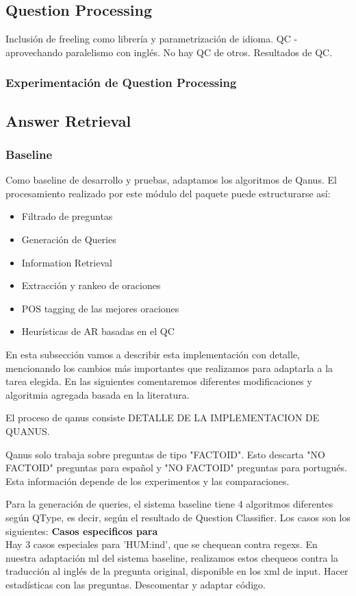 \subsection{Question Processing}
Inclusión de freeling como librería y parametrización de idioma.
QC -aprovechando paralelismo con inglés. No hay QC de otros.
Resultados de QC.
\subsubsection{Experimentación de Question Processing}
\subsection{Answer Retrieval}
\subsubsection{Baseline}
Como baseline de desarrollo y pruebas, adaptamos los algoritmos de Qanus. 
El procesamiento realizado por este módulo del paquete puede estructurarse así:
\begin{itemize}
  \item Filtrado de preguntas
  \item Generación de Queries
  \item Information Retrieval
  \item Extracción y rankeo de oraciones
  \item POS tagging de las mejores oraciones
  \item Heurísticas de AR basadas en el QC
\end{itemize}
En esta subsección vamos a describir esta implementación con detalle, mencionando los cambios más importantes que realizamos para adaptarla a la tarea elegida. En las siguientes comentaremos diferentes modificaciones y algoritmia agregada basada en la literatura. 

El proceso de qanus consiste DETALLE DE LA IMPLEMENTACION DE QUANUS.

Qanus solo trabaja sobre preguntas de tipo "FACTOID". Esto descarta "NO FACTOID" preguntas para español y "NO FACTOID" preguntas para portugués. Esta información depende de los experimentos y las comparaciones.

Para la generación de queries, el sistema baseline tiene 4 algoritmos diferentes según QType, es decir, según el resultado de Question Classifier. 
Los casos son los siguientes:
\textbf{Casos especificos para } \\
Hay 3 casos especiales para 'HUM:ind', que se chequean contra regexs. En nuestra adaptación ml del sistema baseline, realizamos estos chequeos contra la traducción al inglés de la pregunta original, disponible en los xml de input. Hacer estadísticas con las preguntas. Descomentar y adaptar código. 

